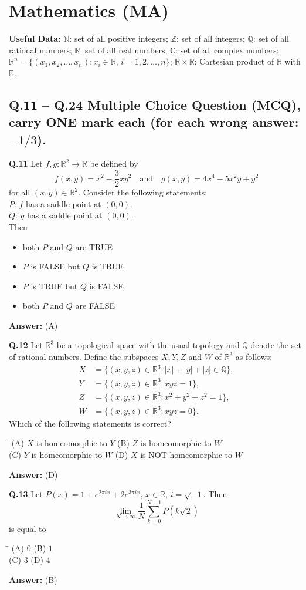 \documentclass[11pt,a4paper]{article}
\newcommand{\optsfourA}[4]{%
  \begin{tabbing}
    \hspace{0.48\linewidth}\=\kill
    (A) #1 \> (B) #2 \\[2pt]
    (C) #3 \> (D) #4
  \end{tabbing}%
}
\newcommand{\optslistA}[4]{%
  \begin{itemize}
    \setlength{\itemsep}{2pt}\setlength{\parskip}{0pt}
    \item[(A)] #1
    \item[(B)] #2
    \item[(C)] #3
    \item[(D)] #4
  \end{itemize}%
}
\newcommand{\ans}[1]{\textbf{Answer:} #1\par\medskip}
\begin{document}
\section*{Mathematics (MA)}

\textbf{Useful Data:} $\mathbb{N}$: set of all positive integers; $\mathbb{Z}$: set of all integers; $\mathbb{Q}$: set of all rational numbers; $\mathbb{R}$: set of all real numbers; $\mathbb{C}$: set of all complex numbers; $\mathbb{R}^n = \{(x_1, x_2, \ldots, x_n) : x_i \in \mathbb{R}, \, i = 1, 2, \ldots, n\}$; $\mathbb{R} \times \mathbb{R}$: Cartesian product of $\mathbb{R}$ with $\mathbb{R}$.

\subsection*{Q.11 -- Q.24 Multiple Choice Question (MCQ), carry ONE mark each (for each wrong answer: $-1/3$).}

\textbf{Q.11} Let $f, g : \mathbb{R}^2 \to \mathbb{R}$ be defined by
\[
  f(x, y) = x^2 - \frac{3}{2} x y^2 \quad \text{and} \quad g(x, y) = 4x^4 - 5x^2 y + y^2
\]
for all $(x, y) \in \mathbb{R}^2$. Consider the following statements:\\
$P$: $f$ has a saddle point at $(0, 0)$.\\
$Q$: $g$ has a saddle point at $(0, 0)$.\\
Then
\optslistA{both $P$ and $Q$ are TRUE}{$P$ is FALSE but $Q$ is TRUE}{$P$ is TRUE but $Q$ is FALSE}{both $P$ and $Q$ are FALSE}
\ans{(A)}

\textbf{Q.12} Let $\mathbb{R}^3$ be a topological space with the usual topology and $\mathbb{Q}$ denote the set of rational numbers. Define the subspaces $X, Y, Z$ and $W$ of $\mathbb{R}^3$ as follows:
\begin{align*}
  X &= \{(x, y, z) \in \mathbb{R}^3 : |x| + |y| + |z| \in \mathbb{Q}\}, \\
  Y &= \{(x, y, z) \in \mathbb{R}^3 : xyz = 1\}, \\
  Z &= \{(x, y, z) \in \mathbb{R}^3 : x^2 + y^2 + z^2 = 1\}, \\
  W &= \{(x, y, z) \in \mathbb{R}^3 : xyz = 0\}.
\end{align*}
Which of the following statements is correct?
\optsfourA{$X$ is homeomorphic to $Y$}{$Z$ is homeomorphic to $W$}{$Y$ is homeomorphic to $W$}{$X$ is NOT homeomorphic to $W$}
\ans{(D)}

\textbf{Q.13} Let $P(x) = 1 + e^{2\pi i x} + 2 e^{3\pi i x}$, $x \in \mathbb{R}$, $i = \sqrt{-1}$. Then
\[
  \lim_{N \to \infty} \frac{1}{N} \sum_{k=0}^{N-1} P(k\sqrt{2})
\]
is equal to
\optsfourA{$0$}{$1$}{$3$}{$4$}
\ans{(B)}
\end{document}
